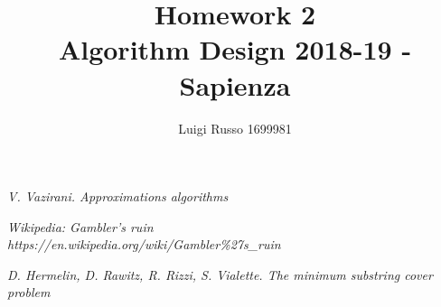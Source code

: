 \documentclass[11pt]{article}
\title{Homework 2\\
	\large Algorithm Design 2018-19 - Sapienza}
\author{Luigi Russo 1699981}
\begin{document}
	
\maketitle

\newpage
\tableofcontents
\newpage



\begin{thebibliography}{10}	
	\textsl{V. Vazirani. Approximations algorithms}
	
	\textsl{Wikipedia: Gambler's ruin} \\
	\textit{https://en.wikipedia.org/wiki/Gambler\%27s\_ruin}
	
	\textsl{D. Hermelin, D. Rawitz, R. Rizzi, S. Vialette. The minimum substring cover problem}
	
\end{thebibliography}
\end{document}
